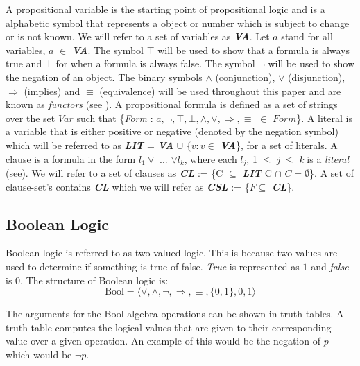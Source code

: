 \documentclass[11pt,a4paper, notitlepage]{report}
\begin{document}
A propositional variable is the starting point of propositional logic and is a alphabetic symbol that represents a object or number which is subject to change or is not known. We will refer to a set of variables as \textit{\textbf{VA}}. Let $a$ stand for all variables, $a$ $\in$ \textit{\textbf{VA}}. The symbol $\top$ will be used to show that a formula is always true and $\bot$ for when a formula is always false. The symbol $\neg$ will be used to show the negation of an object. The binary symbols $\land$ (conjunction), $\lor$ (disjunction), $\Rightarrow$ (implies) and $\equiv$ (equivalence) will be used throughout this paper and are known as \textit{functors} (see \cite{Marek2009Introduction}). A propositional formula is defined as a set of strings over the set $Var$ such that \{\textit{Form} : $a, \neg, \top, \bot, \land, \lor, \Rightarrow, \equiv$ $\in$ $Form$\}. A literal is a variable that is either positive or negative (denoted by the negation symbol) which will be referred to as \textbf{\textit{LIT}} =  \textit{\textbf{VA}} $\cup$  $\{ \bar{v} : v \in$ \textbf{\textit{VA}}\}, for a set of literals. A clause is a formula in the form $l_1 \lor$ ... $\lor l_k$, where each $l_j$, 1 $\le$ \textit{j} $\le$ \textit{k} is a \textit{literal} (see\cite{Marek2009Introduction}). We will refer to a set of clauses as \textbf{\textit{CL}} := \{C $\subseteq$ \textbf{\textit{LIT}} C $\cap$ $\bar{C} = \emptyset$\}. A set of clause-set's contains \textbf{\textit{CL}} which we will refer as \textbf{\textit{CSL}} := \{$F \subseteq$ \textit{\textbf{CL}}\}.

\subsection{Boolean Logic}
\label{sec:bool}

Boolean logic is referred to as two valued logic. This is because two values are used to determine if something is true of false. \emph{True} is represented as $1$ and \emph{false} is $0$. The structure of Boolean logic is:
\begin{displaymath}
\text{Bool} = \langle \lor, \land, \neg, \Rightarrow, \equiv,\{0,1\}, 0, 1 \rangle
\end{displaymath}

The arguments for the Bool algebra operations can be shown in truth tables. A truth table computes the logical values that are given to their corresponding value over a given operation. An example of this would be the negation of $p$ which would be $\neg p$.
\end{document}
